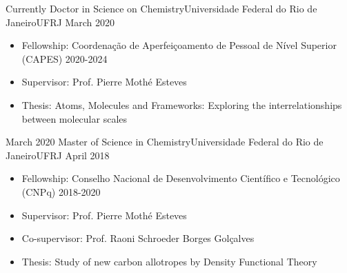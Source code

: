 %
%
%


\begin{experiences}
	  \experience
	{Currently}   {Doctor in Science on Chemistry}{Universidade Federal do Rio de Janeiro}{UFRJ}
	{March 2020} {
		\begin{itemize}
			\item Fellowship: Coordenação de Aperfeiçoamento de Pessoal de Nível Superior (CAPES) 2020-2024                        
			\item Supervisor: Prof. Pierre Mothé Esteves 
			\item Thesis: Atoms, Molecules and Frameworks: Exploring the interrelationships between molecular scales
		\end{itemize}
	}{}
	\emptySeparator
	
	
  \experience
    {March 2020}   {Master of Science in Chemistry}{Universidade Federal do Rio de Janeiro}{UFRJ}
    {April 2018} {
                      \begin{itemize}
                        \item Fellowship: Conselho Nacional de Desenvolvimento Científico e Tecnológico (CNPq) 2018-2020                        
                        \item Supervisor: Prof. Pierre Mothé Esteves 
                        \item Co-supervisor: Prof. Raoni Schroeder Borges Golçalves
                        \item Thesis: Study of new carbon allotropes by Density Functional Theory 
                       \end{itemize}
                    }{}
  \emptySeparator
                    

\end{experiences}
